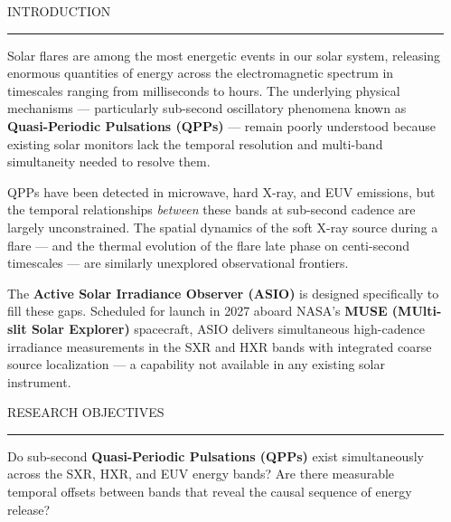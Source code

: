 \documentclass[final]{beamer}
\newcommand{\rqnum}[1]{%
  \tikz[baseline=(n.base)]{%
    \node[circle, fill=accent, text=white,
          font=\scriptsize\bfseries\sffamily,
          minimum size=1.4em, inner sep=0pt] (n) {#1};%
  }%
}
\newcommand{\sectitle}[1]{%
  {\usebeamerfont{block title}\color{accentdark}\MakeUppercase{#1}}%
  \par\nointerlineskip\vspace{2pt}%
  {\color{accent}\rule{\linewidth}{1.5pt}}%
  \par\vspace{4pt}%
}
\newlength{\sepwidth}
\newlength{\leftcolwidth}
\newcommand{\separatorcolumn}{\begin{column}{\sepwidth}\end{column}}
\begin{document}
\begin{frame}[t]
\vspace{0.4cm}
\begin{columns}[t, totalwidth=\paperwidth]
\separatorcolumn

\begin{column}{\leftcolwidth}

\begin{tcolorbox}[glassy]
\sectitle{Introduction}

Solar flares are among the most energetic events in our solar system,
releasing enormous quantities of energy across the electromagnetic
spectrum in timescales ranging from milliseconds to hours. The underlying
physical mechanisms --- particularly sub-second oscillatory phenomena
known as \textbf{\textcolor{accentdark}{Quasi-Periodic Pulsations (QPPs)}}
--- remain poorly understood because existing solar monitors lack the
temporal resolution and multi-band simultaneity needed to resolve them.

QPPs have been detected in microwave, hard X-ray, and EUV emissions,
but the temporal relationships \textit{between} these bands at sub-second
cadence are largely unconstrained. The spatial dynamics of the soft X-ray
source during a flare --- and the thermal evolution of the flare late
phase on centi-second timescales --- are similarly unexplored
observational frontiers.

The \textbf{\textcolor{accentdark}{Active Solar Irradiance Observer (ASIO)}}
is designed specifically to fill these gaps. Scheduled for launch in 2027
aboard NASA's \textbf{\textcolor{accentdark}{MUSE (MUlti-slit Solar
Explorer)}} spacecraft, ASIO delivers simultaneous high-cadence irradiance
measurements in the SXR and HXR bands with integrated coarse source
localization --- a capability not available in any existing solar instrument.
\end{tcolorbox}

\vspace{0.3cm}

\begin{tcolorbox}[glassy]
\sectitle{Research Objectives}

\vspace{2pt}
\noindent\rqnum{1}\hspace{5pt}%
\begin{minipage}[t]{0.88\linewidth}
  Do sub-second \textbf{\textcolor{accentdark}{Quasi-Periodic Pulsations
  (QPPs)}} exist simultaneously across the SXR, HXR, and EUV energy
  bands? Are there measurable temporal offsets between bands that reveal
  the causal sequence of energy release?
\end{minipage}


\end{tcolorbox}
\end{column}
\end{columns}
\end{frame}
\end{document}
